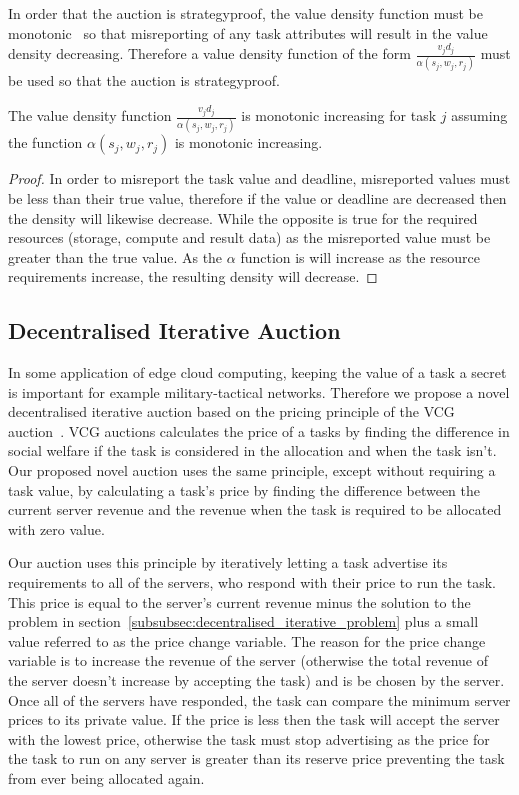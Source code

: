 In order that the auction is strategyproof, the value density function must be
monotonic~\cite{nisan2007algorithmic_229_230} so that misreporting of any task attributes will result in the value
density decreasing. Therefore a value density function of the form $\frac{v_j d_j}{\alpha(s_j, w_j, r_j)}$ must be used so
that the auction is strategyproof.
\begin{theorem}
    The value density function $\frac{v_j d_j}{\alpha(s_j, w_j, r_j)}$ is monotonic increasing for task $j$ assuming the
    function $\alpha(s_j, w_j, r_j)$ is monotonic increasing.
\end{theorem}
\begin{proof}
    In order to misreport the task value and deadline, misreported values must be less than their true value, therefore
    if the value or deadline are decreased then the density will likewise decrease.
    While the opposite is true for the required resources (storage, compute and result data) as the misreported value
    must be greater than the true value. As the $\alpha$ function is will increase as the resource requirements increase,
    the resulting density will decrease.
\end{proof}

\subsection{Decentralised Iterative Auction}\label{subsec:decentralised-iterative-auction}
In some application of edge cloud computing, keeping the value of a task a secret is important for example
military-tactical networks. Therefore we propose a novel decentralised iterative auction based on the pricing principle
of the VCG auction~\citep{vickrey, Clarke, groves}. VCG auctions calculates the price of a tasks by finding the
difference in social welfare if the task is considered in the allocation and when the task isn't. Our proposed novel
auction uses the same principle, except without requiring a task value, by calculating a task's price by finding the
difference between the current server revenue and the revenue when the task is required to be allocated with zero value.

Our auction uses this principle by iteratively letting a task advertise its requirements to all of the servers, who
respond with their price to run the task. This price is equal to the server's current revenue minus the solution to the
problem in section~\ref{subsubsec:decentralised_iterative_problem} plus a small value referred to as the price change
variable. The reason for the price change variable is to increase the revenue of the server (otherwise the total
revenue of the server doesn't increase by accepting the task) and is be chosen by the server. Once all of the servers
have responded, the task can compare the minimum server prices to its private value. If the price is less then the
task will accept the server with the lowest price, otherwise the task must stop advertising as the price for the task
to run on any server is greater than its reserve price preventing the task from ever being allocated again.

